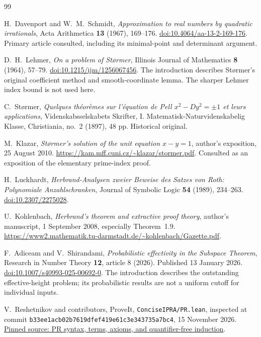 \begin{thebibliography}{99}

H.~Davenport and W.~M.~Schmidt,
\emph{Approximation to real numbers by quadratic \mbox{irrationals}},
Acta Arithmetica \textbf{13} (1967), 169--176.
\href{https://doi.org/10.4064/aa-13-2-169-176}{doi:10.4064/aa-13-2-169-176}.
Primary article consulted, including its minimal-point and determinant argument.

D.~H.~Lehmer, \emph{On a problem of St\o rmer},
Illinois Journal of Mathematics \textbf{8} (1964), 57--79.
\href{https://doi.org/10.1215/ijm/1256067456}{doi:10.1215/ijm/1256067456}.
The introduction describes St\o rmer's original coefficient method and
smooth-coordinate lemma.  The sharper Lehmer index bound is not used here.

C.~St\o rmer, \emph{Quelques th\'eor\`emes sur l'\'equation de Pell
$x^2-Dy^2=\pm1$ et leurs applications},
Videnskabsselskabets Skrifter, I. Matematisk-Naturvidenskabelig Klasse,
Christiania, no.~2 (1897), 48 pp.  Historical original.

M.~Klazar, \emph{St\o rmer's solution of the unit equation $x-y=1$},
author's exposition, 25 August 2010.
\url{https://kam.mff.cuni.cz/~klazar/stormer.pdf}.
Consulted as an exposition of the elementary prime-index proof.

H.~Luckhardt, \emph{Herbrand-Analysen zweier Beweise des Satzes von Roth:
Polynomiale Anzahlschranken},
Journal of Symbolic Logic \textbf{54} (1989), 234--263.
\href{https://doi.org/10.2307/2275028}{doi:10.2307/2275028}.

U.~Kohlenbach, \emph{Herbrand's theorem and extractive proof theory},
author's manuscript, 1 September 2008, especially Theorem~1.9.
\url{https://www2.mathematik.tu-darmstadt.de/~kohlenbach/Gazette.pdf}.

F.~Adiceam and V.~Shirandami,
\emph{Probabilistic effectivity in the Subspace Theorem},
Research in Number Theory \textbf{12}, article 8 (2026).
Published 13 January 2026.
\href{https://doi.org/10.1007/s40993-025-00692-0}{doi:10.1007/s40993-025-00692-0}.
The introduction describes the outstanding effective-height problem;
its probabilistic results are not a uniform cutoff for individual inputs.

V.~Reshetnikov and contributors, ProveIt,
\texttt{ConciseIPRA/PR.lean}, inspected at commit
\texttt{b33ee1acb02b7619dfef419e61c3e343735a7bc4},
15 November 2026.
\href{https://github.com/VladimirReshetnikov/ProveIt/blob/b33ee1acb02b7619dfef419e61c3e343735a7bc4/Logic/PrimitiveRecursiveArithmetic/ConciseIPRA/Lean/ConciseIPRA/PR.lean}{Pinned source: PR syntax, terms, axioms, and quantifier-free induction}.


\end{thebibliography}
